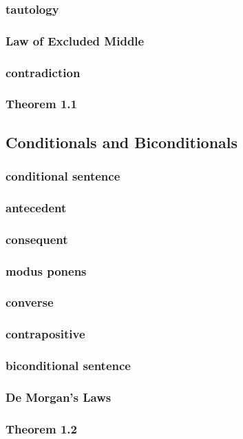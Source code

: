 \documentclass[a4paper]{article}
\begin{document}
\subsubsection*{tautology}
\subsubsection*{Law of Excluded Middle}
\subsubsection*{contradiction}
\subsubsection*{Theorem 1.1}

\newpage
\subsection{Conditionals and Biconditionals}   %
\subsubsection*{conditional sentence}
\subsubsection*{antecedent}
\subsubsection*{consequent}
\subsubsection*{modus ponens}
\subsubsection*{converse}
\subsubsection*{contrapositive}
\subsubsection*{biconditional sentence}
\subsubsection*{De Morgan's Laws}
\subsubsection*{Theorem 1.2}
\end{document}
